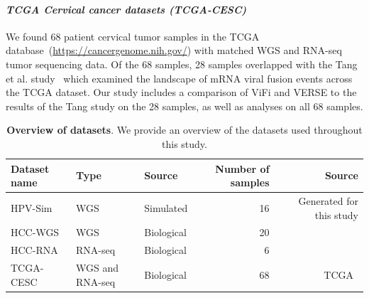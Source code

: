 \documentclass[10pt]{article}
\begin{document}
\paragraph{\emph{TCGA Cervical cancer datasets (TCGA-CESC)}}
We found 68 patient cervical tumor samples in the TCGA database~(\url{https://cancergenome.nih.gov/}) with matched WGS and RNA-seq tumor sequencing data.  Of the 68 samples, 28 samples overlapped with the Tang et al. study~\cite{Tang2013} which examined the landscape of mRNA viral fusion events across the TCGA dataset.  Our study includes a comparison of ViFi and VERSE to the results of the Tang study on the 28 samples, as well as analyses on all 68 samples.


\begin{table}[htb]
\centering
\caption{\textbf{Overview of datasets}.  We provide an overview of the datasets used throughout this study.  }
\label{table:data}
\begin{tabular}{|l|l|l|r|r|}
\hline
Dataset name & Type & Source & Number of samples & Source \\ \hline
HPV-Sim & WGS &Simulated& 16 & Generated for this study \\ \hline
HCC-WGS & WGS & Biological&20 & ~\cite{Sung2012} \\ \hline
HCC-RNA & RNA-seq & Biological&6 & ~\cite{Lau2014} \\ \hline
TCGA-CESC & WGS and RNA-seq &Biological& 68 & TCGA~\cite{TODO} \\ \hline 
\end{tabular}
\end{table}

\end{document}
